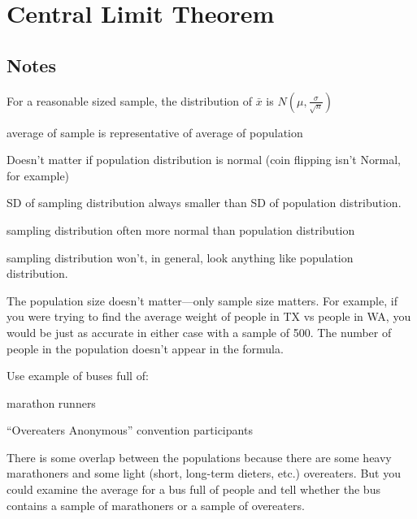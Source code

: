 \documentclass[portrait]{exam}
\begin{document}
  \section{Central Limit Theorem}
  \subsection{Notes}

  For a reasonable sized sample, the distribution of $\bar{x}$ is $N(\mu,
  \frac{\sigma}{\sqrt{n}})$

  \begin{itemize*}
    \item average of sample is representative of average of population
    \item Doesn't matter if population distribution is normal (coin flipping
      isn't Normal, for example)
    \item SD of sampling distribution always smaller than SD of population
      distribution.
    \item sampling distribution often more normal than population distribution

    \item sampling distribution won't, in general, look anything like population
      distribution.
  \end{itemize*}

  The population size doesn't matter---only sample size matters. For example, if
  you were trying to find the average weight of people in TX vs people in WA,
  you would be just as accurate in either case with a sample of 500. The number
  of people in the population doesn't appear in the formula.

  Use example of buses full of:
  \begin{itemize*}
    \item marathon runners
    \item ``Overeaters Anonymous'' convention participants
  \end{itemize*}

  There is some overlap between the populations because there are some heavy
  marathoners and some light (short, long-term dieters, etc.) overeaters. But
  you could examine the average for a bus full of people and tell whether the
  bus contains a sample of marathoners or a sample of overeaters.
\end{document}
